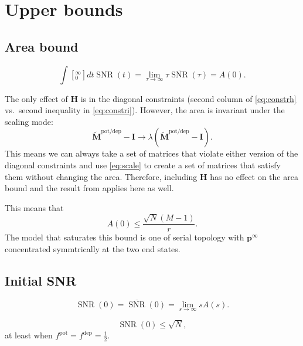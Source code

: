 \documentclass[12pt]{article}
\newcommand{\I}{\mathbf{I}}
\newcommand{\pr}{\mathbf{p}}
\newcommand{\eq}{\pr^\infty}
\newcommand{\M}{\mathbf{M}}
\newcommand{\pot}{^{\text{pot}}}
\newcommand{\dep}{^{\text{dep}}}
\newcommand{\potdep}{^{\text{pot/dep}}}
\renewcommand{\hom}{\mathbf{H}}
\newcommand{\Mh}{\widetilde{\M}}
\DeclareMathOperator{\snr}{SNR}
\newcommand{\snrb}{\overline{\snr}}
\begin{document}
\section{Upper bounds}\label{sec:upperbnds}



\subsection{Area bound}\label{sec:area}


%
\begin{equation}\label{eq:areadef}
  \int[_0^\infty]{dt} \snr(t) = \lim_{\tau\to\infty} \tau \snrb(\tau) = A(0).
\end{equation}
%

The only effect of $\hom$ is in the diagonal constraints (second column of \eqref{eq:constrh} vs.\ second inequality in \eqref{eq:constri}).
However, the area is invariant under the scaling mode:
%
\begin{equation}\label{eq:scale}
  \Mh\potdep - \I \to \lambda (\Mh\potdep - \I).
\end{equation}
%
This means we can always take a set of matrices that violate either version of the diagonal constraints and use \eqref{eq:scale} to create a set of matrices that satisfy them without changing the area.
Therefore, including $\hom$ has no effect on the area bound and the result from \cite{Lahiri2013synapse} applies here as well.

This means that 
%
\begin{equation}\label{eq:areabnd}
  A(0) \leq \frac{\sqrt{N}(M-1)}{r}.
\end{equation}
%
The model that saturates this bound is one of serial topology with $\eq$ concentrated symmtrically at the two end states.



\subsection{Initial SNR}\label{sec:initial}

%
\begin{equation}\label{eq:initdef}
  \snr(0) = \snrb(0) = \lim_{s\to\infty} sA(s).
\end{equation}
%


%
\begin{equation}\label{eq:initbnd}
  \snr(0) \leq \sqrt{N},
\end{equation}
%
at least when $f\pot=f\dep=\frac{1}{2}$.
\end{document}

